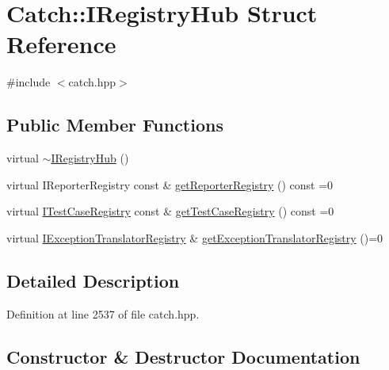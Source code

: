 \hypertarget{struct_catch_1_1_i_registry_hub}{}\section{Catch\+:\+:I\+Registry\+Hub Struct Reference}
\label{struct_catch_1_1_i_registry_hub}


{\ttfamily \#include $<$catch.\+hpp$>$}

\subsection*{Public Member Functions}
\begin{DoxyCompactItemize}
\item 
virtual \hyperlink{struct_catch_1_1_i_registry_hub_a050de0f27f96888c8b410992146c9a09}{$\sim$\+I\+Registry\+Hub} ()
\item 
virtual I\+Reporter\+Registry const  \& \hyperlink{struct_catch_1_1_i_registry_hub_a55534563f7ecf7e20ec1e37285ebe54d}{get\+Reporter\+Registry} () const =0
\item 
virtual \hyperlink{struct_catch_1_1_i_test_case_registry}{I\+Test\+Case\+Registry} const  \& \hyperlink{struct_catch_1_1_i_registry_hub_af4f6255f0c0f8f1f179fa9d7d4843076}{get\+Test\+Case\+Registry} () const =0
\item 
virtual \hyperlink{struct_catch_1_1_i_exception_translator_registry}{I\+Exception\+Translator\+Registry} \& \hyperlink{struct_catch_1_1_i_registry_hub_a3606988da110c016c5af3ae63454eb78}{get\+Exception\+Translator\+Registry} ()=0
\end{DoxyCompactItemize}


\subsection{Detailed Description}


Definition at line 2537 of file catch.\+hpp.



\subsection{Constructor \& Destructor Documentation}
\hypertarget{struct_catch_1_1_i_registry_hub_a050de0f27f96888c8b410992146c9a09}{}\label{struct_catch_1_1_i_registry_hub_a050de0f27f96888c8b410992146c9a09} 

